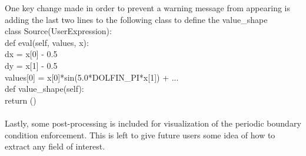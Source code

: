 \documentclass[12pt,3p]{article}
\begin{document}
One key change made in order to prevent a warning message from appearing is adding the last two lines to the following class  to define the {value\_shape \selectfont } \\ 
{\selectfont
class Source(UserExpression): \\
\indent def eval(self, values, x): \\
 \indent\indent       dx = x[0] - 0.5 \\
\indent\indent        dy = x[1] - 0.5 \\
\indent\indent        values[0] = x[0]*sin(5.0*DOLFIN\_PI*x[1]) + ... \\
\indent    def value\_shape(self): \\
 \indent\indent        return () \\ \\
}
Lastly, some post-processing is included for visualization of the periodic boundary condition enforcement. This is left to give future users some idea of how to extract any field of interest. 


\end{document}
